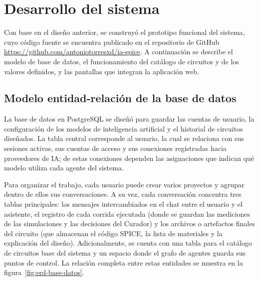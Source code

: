 \section{Desarrollo del sistema}
\label{sec:des-intro}

Con base en el diseño anterior, se construyó el prototipo funcional del sistema, cuyo código fuente se encuentra publicado en el repositorio de GitHub \url{https://github.com/antoniotorresxd/ia-spice}. A continuación se describe el modelo de base de datos, el funcionamiento del catálogo de circuitos y de los valores definidos, y las pantallas que integran la aplicación web.

\subsection{Modelo entidad-relación de la base de datos}
\label{subsec:des-erd}

La base de datos en PostgreSQL se diseñó para guardar las cuentas de usuario, la configuración de los modelos de inteligencia artificial y el historial de circuitos diseñados. La tabla central corresponde al usuario, la cual se relaciona con sus sesiones activas, sus cuentas de acceso y sus conexiones registradas hacia proveedores de IA; de estas conexiones dependen las asignaciones que indican qué modelo utiliza cada agente del sistema.

Para organizar el trabajo, cada usuario puede crear varios proyectos y agrupar dentro de ellos sus conversaciones. A su vez, cada conversación concentra tres tablas principales: los mensajes intercambiados en el chat entre el usuario y el asistente, el registro de cada corrida ejecutada (donde se guardan las mediciones de las simulaciones y las decisiones del Curador) y los archivos o artefactos finales del circuito (que almacenan el código SPICE, la lista de materiales y la explicación del diseño). Adicionalmente, se cuenta con una tabla para el catálogo de circuitos base del sistema y un espacio donde el grafo de agentes guarda sus puntos de control. La relación completa entre estas entidades se muestra en la figura~\ref{fig:erd-base-datos}.

